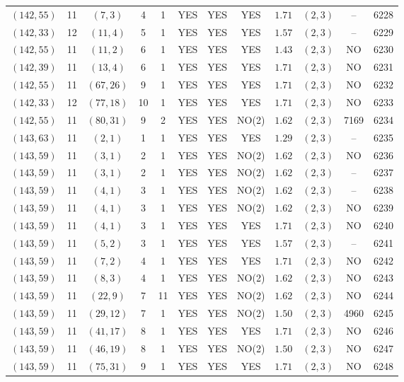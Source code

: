 \begin{longtable}{|c|c|c|c|c|c|c|c|c|c|c|c|}
$(142,55)$ & 11 & $(7,3)$ & 4 & 1 & YES & YES & YES & $1.71$ & $(2,3)$ & -- & 6228\\
$(142,33)$ & 12 & $(11,4)$ & 5 & 1 & YES & YES & YES & $1.57$ & $(2,3)$ & -- & 6229\\
$(142,55)$ & 11 & $(11,2)$ & 6 & 1 & YES & YES & YES & $1.43$ & $(2,3)$ & NO & 6230\\
$(142,39)$ & 11 & $(13,4)$ & 6 & 1 & YES & YES & YES & $1.71$ & $(2,3)$ & NO & 6231\\
$(142,55)$ & 11 & $(67,26)$ & 9 & 1 & YES & YES & YES & $1.71$ & $(2,3)$ & NO & 6232\\
$(142,33)$ & 12 & $(77,18)$ & 10 & 1 & YES & YES & YES & $1.71$ & $(2,3)$ & NO & 6233\\
$(142,55)$ & 11 & $(80,31)$ & 9 & 2 & YES & YES & NO(2) & $1.62$ & $(2,3)$ & 7169 & 6234\\
$(143,63)$ & 11 & $(2,1)$ & 1 & 1 & YES & YES & YES & $1.29$ & $(2,3)$ & -- & 6235\\
$(143,59)$ & 11 & $(3,1)$ & 2 & 1 & YES & YES & NO(2) & $1.62$ & $(2,3)$ & NO & 6236\\
$(143,59)$ & 11 & $(3,1)$ & 2 & 1 & YES & YES & NO(2) & $1.62$ & $(2,3)$ & -- & 6237\\
$(143,59)$ & 11 & $(4,1)$ & 3 & 1 & YES & YES & NO(2) & $1.62$ & $(2,3)$ & -- & 6238\\
$(143,59)$ & 11 & $(4,1)$ & 3 & 1 & YES & YES & NO(2) & $1.62$ & $(2,3)$ & NO & 6239\\
$(143,59)$ & 11 & $(4,1)$ & 3 & 1 & YES & YES & YES & $1.71$ & $(2,3)$ & NO & 6240\\
$(143,59)$ & 11 & $(5,2)$ & 3 & 1 & YES & YES & YES & $1.57$ & $(2,3)$ & -- & 6241\\
$(143,59)$ & 11 & $(7,2)$ & 4 & 1 & YES & YES & YES & $1.71$ & $(2,3)$ & NO & 6242\\
$(143,59)$ & 11 & $(8,3)$ & 4 & 1 & YES & YES & NO(2) & $1.62$ & $(2,3)$ & NO & 6243\\
$(143,59)$ & 11 & $(22,9)$ & 7 & 11 & YES & YES & NO(2) & $1.62$ & $(2,3)$ & NO & 6244\\
$(143,59)$ & 11 & $(29,12)$ & 7 & 1 & YES & YES & NO(2) & $1.50$ & $(2,3)$ & 4960 & 6245\\
$(143,59)$ & 11 & $(41,17)$ & 8 & 1 & YES & YES & YES & $1.71$ & $(2,3)$ & NO & 6246\\
$(143,59)$ & 11 & $(46,19)$ & 8 & 1 & YES & YES & NO(2) & $1.50$ & $(2,3)$ & NO & 6247\\
$(143,59)$ & 11 & $(75,31)$ & 9 & 1 & YES & YES & YES & $1.71$ & $(2,3)$ & NO & 6248\\

\end{longtable}
